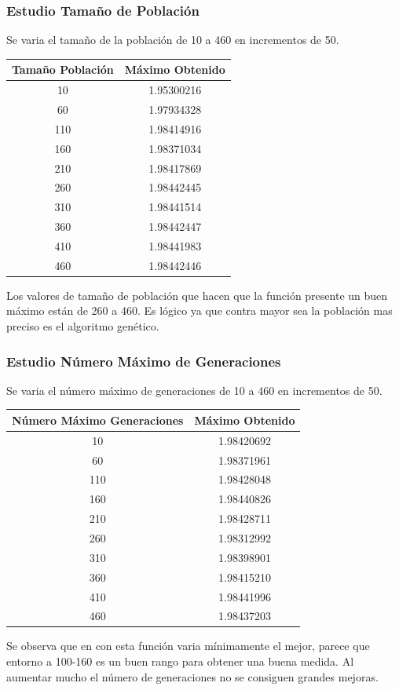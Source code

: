 \documentclass[12pt]{article}
\begin{document}
\subsubsection*{Estudio Tamaño de Población}
	Se varia el tamaño de la población de 10 a 460 en incrementos de 50.
\begin{table}[H]
\begin{center}
\begin{tabular}{|cc|} \hline
Tamaño Población & Máximo Obtenido \\  \hline
10  & 1.95300216 \\ 
60  & 1.97934328 \\ 
110 & 1.98414916 \\
160 & 1.98371034 \\
210 & 1.98417869 \\
260 & 1.98442445 \\
310 & 1.98441514 \\
360 & 1.98442447 \\ 
410 & 1.98441983 \\
460 & 1.98442446 \\  \hline
\end{tabular}
\end{center}
\end{table}
	Los valores de tamaño de población que hacen que la función presente un buen máximo están de 260 a 460. Es lógico ya que contra mayor sea la población mas preciso es el algoritmo genético.   

\subsubsection*{Estudio Número Máximo de Generaciones}
	Se varia el número máximo de generaciones de 10 a 460 en incrementos de 50.
\begin{table}[H]
\begin{center}
\begin{tabular}{|cc|} \hline
Número Máximo Generaciones & Máximo Obtenido \\  \hline
10  & 1.98420692 \\ 
60  & 1.98371961 \\ 
110 & 1.98428048 \\
160 & 1.98440826 \\
210 & 1.98428711 \\
260 & 1.98312992 \\
310 & 1.98398901 \\
360 & 1.98415210 \\ 
410 & 1.98441996 \\
460 & 1.98437203 \\  \hline
\end{tabular}
\end{center}
\end{table}
	Se observa que en con esta función varia mínimamente el mejor, parece que entorno a 100-160 es un buen rango para obtener una buena medida. Al aumentar mucho el número de generaciones no se consiguen grandes mejoras.
\end{document}
